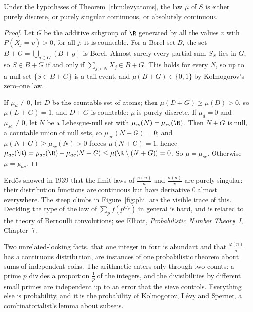 \begin{theorem}\label{thm:jessenwintner}
Under the hypotheses of Theorem~\ref{thm:levyatoms}, the law $\mu$ of $S$ is either purely discrete, or purely singular continuous, or absolutely continuous.
\end{theorem}
\begin{proof}
Let $G$ be the additive subgroup of $\R$ generated by all the values $v$ with $P(X_j=v)>0$, for all $j$; it is countable. For a Borel set $B$, the set $B+G=\bigcup_{g\in G}(B+g)$ is Borel. Almost surely every partial sum $S_N$ lies in $G$, so $S\in B+G$ if and only if $\sum_{j>N}X_j\in B+G$. This holds for every $N$, so up to a null set $\{S\in B+G\}$ is a tail event, and $\mu(B+G)\in\{0,1\}$ by Kolmogorov's zero--one law.

If $\mu_d\ne0$, let $D$ be the countable set of atoms; then $\mu(D+G)\ge\mu(D)>0$, so $\mu(D+G)=1$, and $D+G$ is countable: $\mu$ is purely discrete. If $\mu_d=0$ and $\mu_{sc}\ne0$, let $N$ be a Lebesgue-null set with $\mu_{sc}(N)=\mu_{sc}(\R)$. Then $N+G$ is null, a countable union of null sets, so $\mu_{ac}(N+G)=0$; and $\mu(N+G)\ge\mu_{sc}(N)>0$ forces $\mu(N+G)=1$, hence $\mu_{ac}(\R)=\mu_{ac}(\R)-\mu_{ac}(N+G)\le\mu(\R\setminus(N+G))=0$. So $\mu=\mu_{sc}$. Otherwise $\mu=\mu_{ac}$.
\end{proof}

\begin{remark}
Erd\H{o}s showed in 1939 that the limit laws of $\frac{\varphi(n)}n$ and $\frac{\sigma(n)}n$ are purely singular: their distribution functions are continuous but have derivative $0$ almost everywhere. The steep climbs in Figure~\ref{fig:phi} are the visible trace of this. Deciding the type of the law of $\sum_p f(p^{G_p})$ in general is hard, and is related to the theory of Bernoulli convolutions; see Elliott, \emph{Probabilistic Number Theory~I}, Chapter~7.
\end{remark}

\begin{beauty}
Two unrelated-looking facts, that one integer in four is abundant and that $\frac{\varphi(n)}n$ has a continuous distribution, are instances of one probabilistic theorem about sums of independent coins. The arithmetic enters only through two counts: a prime $p$ divides a proportion $\frac1p$ of the integers, and the divisibilities by different small primes are independent up to an error that the sieve controls. Everything else is probability, and it is the probability of Kolmogorov, L\'evy and Sperner, a combinatorialist's lemma about subsets.
\end{beauty}

